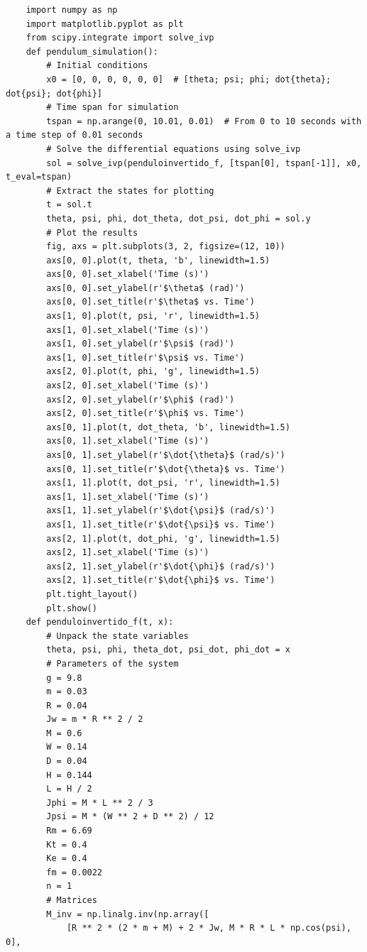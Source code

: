 \documentclass[10pt]{article}
\begin{document}
\begin{appendices}
\begin{verbatim}
    import numpy as np
    import matplotlib.pyplot as plt
    from scipy.integrate import solve_ivp
    def pendulum_simulation():
        # Initial conditions
        x0 = [0, 0, 0, 0, 0, 0]  # [theta; psi; phi; dot{theta}; dot{psi}; dot{phi}]
        # Time span for simulation
        tspan = np.arange(0, 10.01, 0.01)  # From 0 to 10 seconds with a time step of 0.01 seconds
        # Solve the differential equations using solve_ivp
        sol = solve_ivp(penduloinvertido_f, [tspan[0], tspan[-1]], x0, t_eval=tspan)
        # Extract the states for plotting
        t = sol.t
        theta, psi, phi, dot_theta, dot_psi, dot_phi = sol.y
        # Plot the results
        fig, axs = plt.subplots(3, 2, figsize=(12, 10))
        axs[0, 0].plot(t, theta, 'b', linewidth=1.5)
        axs[0, 0].set_xlabel('Time (s)')
        axs[0, 0].set_ylabel(r'$\theta$ (rad)')
        axs[0, 0].set_title(r'$\theta$ vs. Time')
        axs[1, 0].plot(t, psi, 'r', linewidth=1.5)
        axs[1, 0].set_xlabel('Time (s)')
        axs[1, 0].set_ylabel(r'$\psi$ (rad)')
        axs[1, 0].set_title(r'$\psi$ vs. Time')
        axs[2, 0].plot(t, phi, 'g', linewidth=1.5)
        axs[2, 0].set_xlabel('Time (s)')
        axs[2, 0].set_ylabel(r'$\phi$ (rad)')
        axs[2, 0].set_title(r'$\phi$ vs. Time')
        axs[0, 1].plot(t, dot_theta, 'b', linewidth=1.5)
        axs[0, 1].set_xlabel('Time (s)')
        axs[0, 1].set_ylabel(r'$\dot{\theta}$ (rad/s)')
        axs[0, 1].set_title(r'$\dot{\theta}$ vs. Time')
        axs[1, 1].plot(t, dot_psi, 'r', linewidth=1.5)
        axs[1, 1].set_xlabel('Time (s)')
        axs[1, 1].set_ylabel(r'$\dot{\psi}$ (rad/s)')
        axs[1, 1].set_title(r'$\dot{\psi}$ vs. Time')
        axs[2, 1].plot(t, dot_phi, 'g', linewidth=1.5)
        axs[2, 1].set_xlabel('Time (s)')
        axs[2, 1].set_ylabel(r'$\dot{\phi}$ (rad/s)')
        axs[2, 1].set_title(r'$\dot{\phi}$ vs. Time')
        plt.tight_layout()
        plt.show()
    def penduloinvertido_f(t, x):
        # Unpack the state variables
        theta, psi, phi, theta_dot, psi_dot, phi_dot = x
        # Parameters of the system
        g = 9.8
        m = 0.03
        R = 0.04
        Jw = m * R ** 2 / 2
        M = 0.6
        W = 0.14
        D = 0.04
        H = 0.144
        L = H / 2
        Jphi = M * L ** 2 / 3
        Jpsi = M * (W ** 2 + D ** 2) / 12
        Rm = 6.69
        Kt = 0.4
        Ke = 0.4
        fm = 0.0022
        n = 1
        # Matrices
        M_inv = np.linalg.inv(np.array([
            [R ** 2 * (2 * m + M) + 2 * Jw, M * R * L * np.cos(psi), 0],

\end{verbatim}
\end{appendices}
\end{document}
